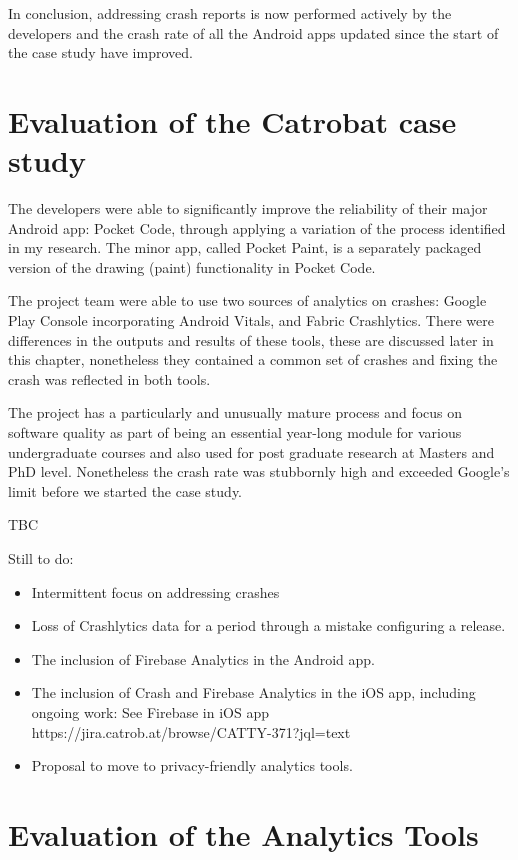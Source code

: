 In conclusion, addressing crash reports is now performed actively by the developers and the crash rate of all the Android apps updated since the start of the case study have improved.

\section{Evaluation of the Catrobat case study}
The developers were able to significantly improve the reliability of their major Android app: Pocket Code, through applying a variation of the process identified in my research. The minor app, called Pocket Paint, is a separately packaged version of the drawing (paint) functionality in Pocket Code.

The project team were able to use two sources of analytics on crashes: Google Play Console incorporating Android Vitals, and Fabric Crashlytics. There were differences in the outputs and results of these tools, these are discussed later in this chapter, nonetheless they contained a common set of crashes and fixing the crash was reflected in both tools.

The project has a particularly and unusually mature process and focus on software quality as part of being an essential year-long module for various undergraduate courses and also used for post graduate research at Masters and PhD level. Nonetheless the crash rate was stubbornly high and exceeded Google's limit before we started the case study.

TBC

Still to do:
\begin{itemize}
    \item Intermittent focus on addressing crashes
    \item Loss of Crashlytics data for a period through a mistake configuring a release.
    \item The inclusion of Firebase Analytics in the Android app.
    \item The inclusion of Crash and Firebase Analytics in the iOS app, including ongoing work: See Firebase in iOS app https://jira.catrob.at/browse/CATTY-371?jql=text%
    \item Proposal to move to privacy-friendly analytics tools. 
\end{itemize}



\section{Evaluation of the Analytics Tools}

